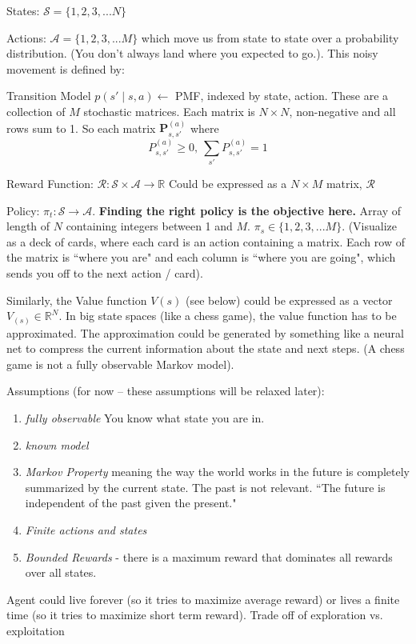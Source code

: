 \documentclass[11pt, oneside]{article}   	%
\begin{document}
States: $\mathcal{S} = \{1,2,3,...N\}$

Actions: $\mathcal{A} = \{1,2,3,...M\}$ which move us from state to state over a probability distribution. (You don't always land where you expected to go.). This noisy movement is defined by:

Transition Model $p(s'\mid s,a) \leftarrow$  PMF, indexed by state, action. These are a collection of $M$ stochastic matrices. Each matrix is $N \times N$, non-negative and all rows sum to 1. So each matrix $\mathbf{P}_{s,s'}^{(a)}$ where 
\[
	P_{s,s'}^{(a)} \ge 0, \: \sum_{s'}P_{s,s'}^{(a)} = 1
\]

Reward Function: $\mathcal{R}: \mathcal{S} \times \mathcal{A} \rightarrow \mathbb{R}$ Could be expressed as a $N \times M$ matrix, $\mathbf{\mathcal{R}}$

Policy: $\pi_t: \mathcal{S} \rightarrow \mathcal{A}$. \textbf{Finding the right policy is the objective here.} Array of length of $N$ containing integers between 1 and $M$. $\pi_s \in \{1,2,3,...M\}$.  (Visualize as a deck of cards, where each card is an action containing a matrix. Each row of the matrix is ``where you are" and each column is ``where you are going", which sends you off to the next action / card).

Similarly, the Value function $V(s)$ (see below) could be expressed as a vector $V_{(s)} \in \mathbb{R}^N$. In big state spaces (like a chess game), the value function has to be approximated. The approximation could be generated by something like a neural net to compress the current information about the state and next steps. (A chess game is not a fully observable Markov model).

Assumptions (for now -- these assumptions will be relaxed later):
\begin{enumerate}
	\item \emph{fully observable} You know what state you are in.
	\item \emph{known model}
	\item \emph{Markov Property} meaning the way the world works in the future is completely summarized by the current state. The past is not relevant. ``The future is independent of the past given the present."
	\item \emph{Finite actions and states}
	\item \emph{Bounded Rewards} - there is a maximum reward that dominates all rewards over all states.
\end{enumerate}

Agent could live forever (so it tries to maximize average reward) or lives a finite time (so it tries to maximize short term reward). Trade off of exploration vs. exploitation
\end{document}

